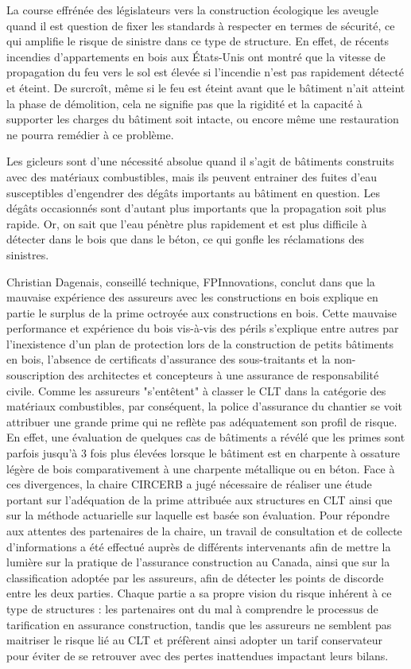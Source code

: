 \documentclass[11pt]{article}
\begin{document}
La course effrénée des législateurs vers la construction écologique les aveugle quand il est question de fixer les standards à respecter en termes de sécurité, ce qui amplifie le risque de sinistre dans ce type de structure. En effet, de récents incendies d'appartements en bois aux États-Unis ont montré que la vitesse de propagation du feu vers le sol est élevée si l'incendie n'est pas rapidement détecté et éteint. De surcroît, même si le feu est éteint avant que le bâtiment n'ait atteint la phase de démolition, cela ne signifie pas que la rigidité et la capacité à supporter les charges du bâtiment soit intacte, ou encore même une restauration ne pourra remédier à ce problème.

Les gicleurs sont d'une nécessité absolue quand il s'agit de bâtiments construits avec des matériaux combustibles, mais ils peuvent entrainer des fuites d'eau susceptibles d'engendrer des dégâts importants au bâtiment en question. Les dégâts occasionnés sont d'autant plus importants que la propagation soit plus rapide. Or, on sait que l'eau pénètre plus rapidement et est plus difficile à détecter dans le bois que dans le béton, ce qui gonfle les réclamations des sinistres.

Christian Dagenais, conseillé technique, FPInnovations, conclut dans \cite{cecobois} que la mauvaise expérience des assureurs avec les constructions en bois explique en partie le surplus de la prime octroyée aux constructions en bois. Cette mauvaise performance et expérience du bois vis-à-vis des périls s'explique entre autres par l'inexistence d'un plan de protection lors de la construction de petits bâtiments en bois, l'absence de certificats d'assurance des sous-traitants et la non-souscription des architectes et concepteurs à une assurance de responsabilité civile. Comme les assureurs "s'entêtent" à classer le CLT dans la catégorie des matériaux combustibles, par conséquent, la police d'assurance du chantier se voit attribuer une grande prime qui ne reflète pas adéquatement son profil de risque. 
En effet, une évaluation de quelques cas de bâtiments a révélé que les primes sont parfois jusqu'à 3 fois plus élevées lorsque le bâtiment est en charpente à ossature légère de bois comparativement à une charpente métallique ou en béton.​
Face à ces divergences, la chaire CIRCERB a jugé nécessaire de réaliser une étude portant sur l'adéquation de la prime attribuée aux structures en CLT ainsi que sur la méthode actuarielle sur laquelle est basée son évaluation. Pour répondre aux attentes des partenaires de la chaire, un travail de consultation et de collecte d'informations a été effectué auprès de différents intervenants afin de mettre la lumière sur la pratique de l'assurance construction au Canada, ainsi que sur la classification adoptée par les assureurs, afin de détecter les points de discorde entre les deux parties. Chaque partie a sa propre vision du risque inhérent à ce type de structures : les partenaires ont du mal à comprendre le processus de tarification en assurance construction, tandis que les assureurs ne semblent pas maitriser le risque lié au CLT et préfèrent ainsi adopter un tarif conservateur pour éviter de se retrouver avec des pertes inattendues impactant leurs bilans.
\end{document}
